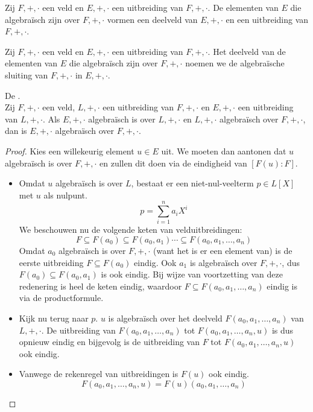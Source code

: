 \documentclass[main.tex]{subfiles}
\begin{document}
\begin{gev}
  Zij $F,+,\cdot$ een veld en $E,+,\cdot$ een uitbreiding van $F,+,\cdot$.
  De elementen van $E$ die algebra\"isch zijn over $F,+,\cdot$ vormen een deelveld van $E,+,\cdot$ en een uitbreiding van $F,+,\cdot$.
\end{gev}

\begin{de}
  Zij $F,+,\cdot$ een veld en $E,+,\cdot$ een uitbreiding van $F,+,\cdot$.
  Het deelveld van de elementen van $E$ die algebra\"isch zijn over $F,+,\cdot$ noemen we de algebra\"ische sluiting van $F,+,\cdot$ in $E,+,\cdot$.
\end{de}

\begin{st}
\label{st:transitiviteit-algebraisch-zijn}
  De .\\
  Zij $F,+,\cdot$ een veld, $L,+,\cdot$ een uitbreiding van $F,+,\cdot$ en $E,+,\cdot$ een uitbreiding van $L,+,\cdot$.
  Als $E,+,\cdot$ algebra\"isch is over $L,+,\cdot$ en $L,+,\cdot$ algebra\"isch over $F,+,\cdot$, dan is $E,+,\cdot$ algebra\"isch over $F,+,\cdot$.

  \begin{proof}
    Kies een willekeurig element $u\in E$ uit.
    We moeten dan aantonen dat $u$ algebra\"isch is over $F,+,\cdot$ en zullen dit doen via de eindigheid van $[F(u):F]$.
    \begin{itemize}
    \item Omdat $u$ algebra\"isch is over $L$, bestaat er een
      niet-nul-veelterm $p\in L[X]$ met $u$ als nulpunt.
      \[ p = \sum_{i=1}^{n}a_{i}X^{i} \] We beschouwen nu de volgende
      keten van velduitbreidingen:
      \[ F \subseteq F(a_{0}) \subseteq F(a_{0},a_{1}) \dotsb
      \subseteq F(a_{0},a_{1},\dotsc,a_{n}) \] Omdat $a_{0}$
      algebra\"isch is over $F,+,\cdot$ (want het is er een element
      van) is de eerste uitbreiding $F \subseteq F(a_{0})$ eindig.
      Ook $a_{1}$ is algebra\"isch over $F,+,\cdot$, dus $F(a_{0})
      \subseteq F(a_{0},a_{1})$ is ook eindig.  Bij wijze van
      voortzetting van deze redenering is heel de keten eindig,
      waardoor $F \subseteq F(a_{0},a_{1},\dotsc,a_{n})$ eindig is via
      de productformule.
    \item Kijk nu terug naar $p$.
      $u$ is algebra\"isch over het deelveld $F(a_{0},a_{1},\dotsc,a_{n})$ van $L,+,\cdot$.
      De uitbreiding van $F(a_{0},a_{1},\dotsc,a_{n})$ tot $F(a_{0},a_{1},\dotsc,a_{n},u)$ is dus opnieuw eindig en bijgevolg is de uitbreiding van $F$ tot $F(a_{0},a_{1},\dotsc,a_{n},u)$ ook eindig.
    \item Vanwege de rekenregel van uitbreidingen is $F(u)$ ook eindig.
      \[ F(a_{0},a_{1},\dotsc,a_{n},u) = F(u)(a_{0},a_{1},\dotsc,a_{n}) \]
    \end{itemize}
  \end{proof}
\end{st}
\end{document}
